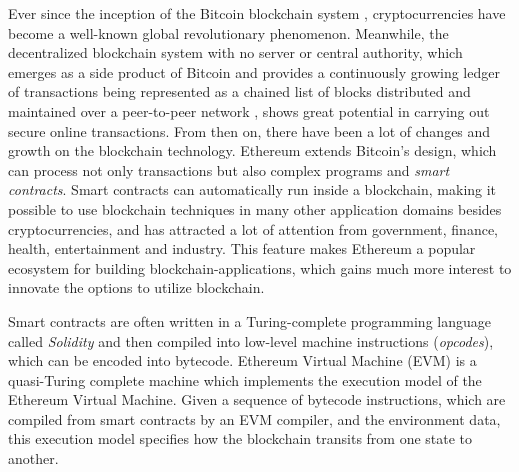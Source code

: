 \documentclass[runningheads]{llncs}
\begin{document}
Ever since the inception of the Bitcoin blockchain system \cite{nakamoto2008bitcoin}, cryptocurrencies have become a well-known global revolutionary phenomenon. Meanwhile, the decentralized blockchain system with no server or central authority, which emerges as a side product of Bitcoin and provides a continuously growing ledger of transactions being represented as a chained list of blocks distributed and maintained over a peer-to-peer network \cite{ZXDCW18}, shows great potential in carrying out secure online transactions. From then on, there have been a lot of changes and growth on the blockchain technology. %
Ethereum \cite{Ethereum} extends Bitcoin's design, which can process not only transactions but also complex programs and {\em smart contracts}. Smart contracts can automatically run inside a blockchain, 
making it possible to use blockchain techniques in many other application domains besides cryptocurrencies, and has attracted a lot of attention from government, finance, health, entertainment and industry. This feature makes Ethereum a popular ecosystem for building blockchain-applications, which gains much more interest to innovate the options to utilize blockchain. 

Smart contracts are often written in a Turing-complete programming language called \textit{Solidity} \cite{solidity} and then compiled into low-level machine instructions (\textit{opcodes}), which can be encoded into bytecode. Ethereum Virtual Machine (EVM) is a quasi-Turing complete machine which implements the execution model of the Ethereum Virtual Machine. Given a sequence of bytecode instructions, which are compiled from smart contracts by an EVM compiler, and the environment data, this execution model specifies how the blockchain transits from one state to another. 
\end{document}
